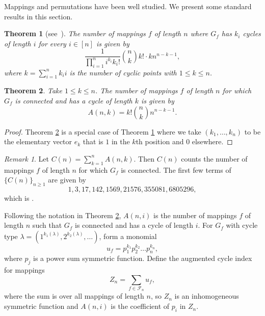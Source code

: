 \documentclass[letterpaper]{amsart}
\theoremstyle{plain}
\newtheorem{theorem}{Theorem}
\theoremstyle{definition}
\theoremstyle{remark}
\newtheorem*{remark}{Remark}
\begin{document}
Mappings and permutations have been well studied. We present some standard results in this section.

\begin{theorem}[{see~\cite[section 3.3.13]{Goulden1983}}]\label{main-cycle-count: mapping}
The number of mappings $f$ of length $n$ where $G_f$ has $k_i$ cycles of length $i$ for every $i \in [n]$ is given by
\begin{equation*}
\frac{1}{\prod_{i=1}^n i^{k_i} k_i!}\binom{n}{k} k! \cdot k n^{n-k-1},
\end{equation*}
where $k=\sum_{i=1}^n k_i i$ is the number of cyclic points with $1\leq k\leq n$.
\end{theorem}

\begin{theorem}\label{main-cycle-count-special: mapping}
Take $1\leq k\leq n$. The number of mappings $f$ of length $n$ for which $G_f$ is connected and has a cycle of length $k$ is given by
\begin{equation*}
A(n, k)=k! \binom{n}{k} n^{n-k-1}.
\end{equation*}
\end{theorem}

\begin{proof}
Theorem \ref{main-cycle-count-special: mapping} is a special case of Theorem \ref{main-cycle-count: mapping} where we take $(k_1, \dots, k_n)$ to be the elementary vector $e_k$ that is $1$ in the $k$th position and $0$ elsewhere.
\end{proof}

\begin{remark}\label{rk:mapping}
Let $C(n)=\sum_{k=1}^n A(n, k)$. Then $C(n)$ counts the number of mappings $f$ of length $n$ for which $G_f$ is connected. The first few terms of $\{C(n)\}_{n \geq 1}$ are given by
\[1, 3, 17, 142, 1569, 21576, 355081, 6805296,\]
which is \cite[OEIS A001865]{OEIS}.
\end{remark}

Following the notation in Theorem \ref{main-cycle-count-special: mapping}, $A(n,i)$ is the number of mappings $f$ of length $n$ such that $G_f$ is connected 
and has a cycle of length $i$. For $G_f$ with cycle type $\lambda=(1^{k_1(\lambda)}, 2^{k_2(\lambda)}, \dots)$, form a monomial 
\[u_f=p_1^{k_1} p_2^{k_2} \dots p_n^{k_n},\]
where $p_j$ is a power sum symmetric function. Define the augmented cycle index for mappings
\begin{equation*}
Z_n=\sum_{f \in \mathcal{F}_n} u_f,
\end{equation*}
where the sum is over all mappings of length $n$, so $Z_n$ is an inhomogeneous symmetric function and $A(n,i)$ is the coefficient of $p_i$ in $Z_n$.
\end{document}
